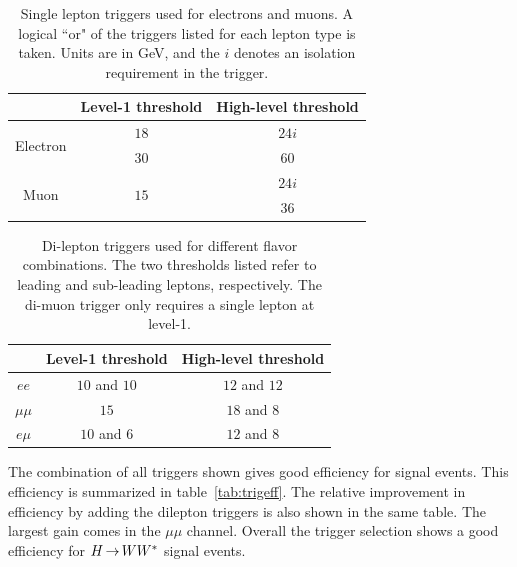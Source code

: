 \begin{table}[h!]
\centering
\captionsetup{justification=centering}

\hspace{-10pt}
\begin{tabular}{|c|c|c|}
\hline
 & Level-1 threshold & High-level threshold \\ \hline \hline
\multirow{2}{*}{Electron} & $18$ & $24i$ \\ 
 & $30$ & $60$ \\ \hline

\multirow{2}{*}{Muon} & \multirow{2}{*}{$15$} & $24i$ \\ 
& & $36$ \\ 
 \hline

\end{tabular}

\caption{
Single lepton triggers used for electrons and muons. A logical ``or" of the triggers listed for each lepton type is taken. Units are in GeV, and the $i$ denotes an isolation requirement in the trigger. 
}
\label{tab:single-lepton-trig}
\end{table}

\begin{table}[h!]
\centering
\captionsetup{justification=centering}

\hspace{-10pt}
\begin{tabular}{|c|c|c|}
\hline
 & Level-1 threshold & High-level threshold \\ \hline \hline
$ee$ & $10$ and $10$ & $12$ and $12$ \\ \hline
$\mu\mu$ & $15$ & $18$ and $8$ \\ \hline
$e\mu$ & $10$ and $6$ & $12$ and $8$ \\ \hline
\end{tabular}

\caption{
Di-lepton triggers used for different flavor combinations. The two thresholds listed refer to leading and sub-leading leptons, respectively. The di-muon trigger only requires a single lepton at level-1. 
}
\label{tab:dilepton-trig}
\end{table}

The combination of all triggers shown gives good efficiency for signal events. This efficiency is summarized in table~\ref{tab:trigeff}. The relative improvement in efficiency by adding the dilepton triggers is also shown in the same table. The largest gain comes in the $\mu\mu$ channel. Overall the trigger selection shows a good efficiency for $H{\,{\rightarrow}\,}WW^\ast$ signal events.

